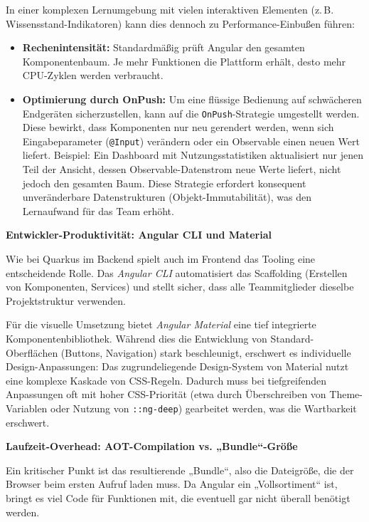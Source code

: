 In einer komplexen Lernumgebung mit vielen interaktiven Elementen (z.\,B. Wissensstand-Indikatoren) kann dies dennoch zu Performance-Einbußen führen:
\begin{itemize}
\item \textbf{Rechenintensität:} Standardmäßig prüft Angular den gesamten Komponentenbaum. Je mehr Funktionen die Plattform erhält, desto mehr CPU-Zyklen werden verbraucht.
\item \textbf{Optimierung durch OnPush:} Um eine flüssige Bedienung auf schwächeren Endgeräten sicherzustellen, kann auf die \texttt{OnPush}-Strategie umgestellt werden. Diese bewirkt, dass Komponenten nur neu gerendert werden, wenn sich Eingabeparameter (\texttt{@Input}) verändern oder ein Observable einen neuen Wert liefert. Beispiel: Ein Dashboard mit Nutzungsstatistiken aktualisiert nur jenen Teil der Ansicht, dessen Observable-Datenstrom neue Werte liefert, nicht jedoch den gesamten Baum. Diese Strategie erfordert konsequent unveränderbare Datenstrukturen (Objekt-Immutabilität), was den Lernaufwand für das Team erhöht.
\end{itemize}


\vspace{0.7cm}
\textbf{Entwickler-Produktivität: Angular CLI und Material}


Wie bei Quarkus im Backend spielt auch im Frontend das Tooling eine entscheidende Rolle. Das \textit{Angular CLI} automatisiert das Scaffolding (Erstellen von Komponenten, Services) und stellt sicher, dass alle Teammitglieder dieselbe Projektstruktur verwenden.


Für die visuelle Umsetzung bietet \textit{Angular Material} eine tief integrierte Komponentenbibliothek. Während dies die Entwicklung von Standard-Oberflächen (Buttons, Navigation) stark beschleunigt, erschwert es individuelle Design-Anpassungen: Das zugrundeliegende Design-System von Material nutzt eine komplexe Kaskade von CSS-Regeln. Dadurch muss bei tiefgreifenden Anpassungen oft mit hoher CSS-Priorität (etwa durch Überschreiben von Theme-Variablen oder Nutzung von \texttt{::ng-deep}) gearbeitet werden, was die Wartbarkeit erschwert.


\vspace{0.7cm}
\textbf{Laufzeit-Overhead: AOT-Compilation vs. „Bundle“-Größe}


Ein kritischer Punkt ist das resultierende „Bundle“, also die Dateigröße, die der Browser beim ersten Aufruf laden muss. Da Angular ein „Vollsortiment“ ist, bringt es viel Code für Funktionen mit, die eventuell gar nicht überall benötigt werden.


